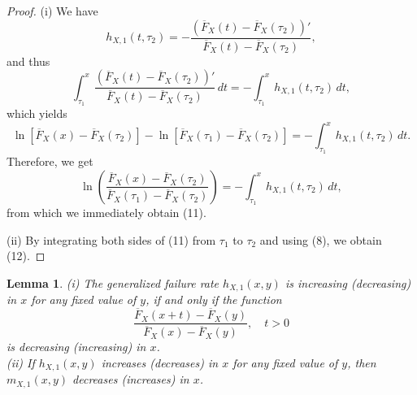 \documentclass[11pt]{article}
\newtheorem{lemma}{Lemma}
\begin{document}
\begin{proof} (i) We have  
	$$ \textstyle h_{X,1}(t, \tau_2) = -\frac{(\overline{F}_X(t) - \overline{F}_X(\tau_2))'}{\overline{F}_X(t) - \overline{F}_X(\tau_2)}, $$
	and thus  
	$$ \textstyle \int_{\tau_1}^x \frac{(\overline{F}_X(t) - \overline{F}_X(\tau_2))'}{\overline{F}_X(t) - \overline{F}_X(\tau_2)} \, dt = -\int_{\tau_1}^x h_{X,1}(t, \tau_2) \, dt, $$
	which yields  
	$$ \textstyle \ln[\overline{F}_X(x) - \overline{F}_X(\tau_2)] - \ln[\overline{F}_X(\tau_1) - \overline{F}_X(\tau_2)] = -\int_{\tau_1}^x h_{X,1}(t, \tau_2) \, dt. $$
	Therefore, we get  
	$$ \textstyle \ln\left( \frac{\overline{F}_X(x) - \overline{F}_X(\tau_2)}{\overline{F}_X(\tau_1) - \overline{F}_X(\tau_2)} \right) = -\int_{\tau_1}^x h_{X,1}(t, \tau_2) \, dt, $$
	from which we immediately obtain (11).
	
	\noindent (ii) By integrating both sides of (11) from $\tau_1$ to $\tau_2$ and using (8), we obtain (12). 
\end{proof}

 
\begin{lemma}
	(i) The generalized failure rate $h_{X,1}(x,y)$ is increasing (decreasing) in $x$ for any fixed value of $y$, if and only if the function
	$$ \textstyle \frac{\overline{F}_X (x+t)-\overline{F}_X (y)}{\overline{F}_X (x)-\overline{F}_X (y)}, \quad t>0 $$
	is decreasing (increasing) in $x$. \\
	(ii) If $h_{X,1}(x,y)$ increases (decreases) in $x$ for any fixed value of $y$, then $m_{X,1}(x,y)$ decreases (increases) in $x$.
\end{lemma}
\end{document}
